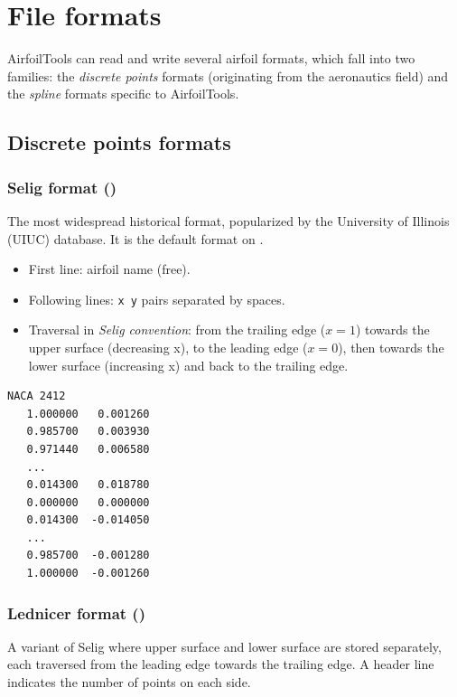 \chapter{File formats}
\label{chap:formats}

AirfoilTools can read and write several airfoil formats, which
fall into two families: the \emph{discrete points} formats
(originating from the aeronautics field) and the \emph{spline}
formats specific to AirfoilTools.

\section{Discrete points formats}

\subsection{Selig format ()}

The most widespread historical format, popularized by the
University of Illinois (UIUC) database. It is the default format
on .

\begin{itemize}
    \item First line: airfoil name (free).
    \item Following lines: \texttt{x y} pairs separated by
        spaces.
    \item Traversal in \emph{Selig convention}: from the trailing edge
        ($x=1$) towards the upper surface (decreasing x), to the leading
        edge ($x=0$), then towards the lower surface (increasing x)
        and back to the trailing edge.
\end{itemize}

\begin{lstlisting}[caption={Example Selig file (NACA~2412)}]
NACA 2412
   1.000000   0.001260
   0.985700   0.003930
   0.971440   0.006580
   ...
   0.014300   0.018780
   0.000000   0.000000
   0.014300  -0.014050
   ...
   0.985700  -0.001280
   1.000000  -0.001260
\end{lstlisting}

\subsection{Lednicer format ()}

A variant of Selig where upper surface and lower surface are stored
separately, each traversed from the leading edge towards the trailing
edge. A header line indicates the number of points on each
side.

